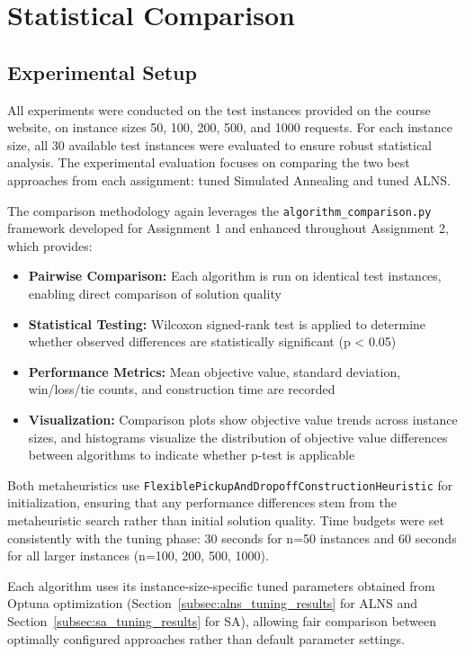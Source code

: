 \documentclass[a4paper]{scrartcl}
\begin{document}
\section{Statistical Comparison}

\subsection{Experimental Setup}

All experiments were conducted on the test instances provided on the course website, on instance sizes 50, 100, 200, 500, and 1000 requests.
For each instance size, all 30 available test instances were evaluated to ensure robust statistical analysis.
The experimental evaluation focuses on comparing the two best approaches from each assignment:
tuned Simulated Annealing and tuned ALNS.

The comparison methodology again leverages the \texttt{algorithm\_comparison.py} framework developed for Assignment 1
and enhanced throughout Assignment 2, which provides:
\begin{itemize}
    \item \textbf{Pairwise Comparison:} Each algorithm is run on identical test instances, enabling direct comparison of solution quality
    \item \textbf{Statistical Testing:} Wilcoxon signed-rank test is applied to determine whether observed differences are statistically significant (p < 0.05)
    \item \textbf{Performance Metrics:} Mean objective value, standard deviation, win/loss/tie counts, and construction time are recorded
    \item \textbf{Visualization:} Comparison plots show objective value trends across instance sizes, and histograms
    visualize the distribution of objective value differences between algorithms to indicate whether p-test is applicable
\end{itemize}

Both metaheuristics use \texttt{FlexiblePickupAndDropoffConstructionHeuristic} for initialization, ensuring that any
performance differences stem from the metaheuristic search rather than initial solution quality.
Time budgets were set consistently with the tuning phase: 30 seconds for n=50 instances and 60 seconds for all
larger instances (n=100, 200, 500, 1000).

Each algorithm uses its instance-size-specific tuned parameters obtained from Optuna optimization
(Section~\ref{subsec:alns_tuning_results} for ALNS and Section~\ref{subsec:sa_tuning_results} for SA),
allowing fair comparison between optimally configured approaches rather than default parameter settings.
\end{document}
